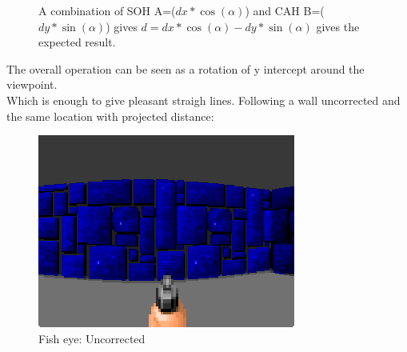 \begin{figure}[H]
\centering
 
 \caption{A combination of SOH A=($dx * \cos(\alpha)$) and CAH B=($ dy * \sin(\alpha) $) gives $d = dx * \cos(\alpha) - dy * \sin(\alpha) $ gives the expected result.}
\end{figure}

The overall operation can be seen as a rotation of y intercept around the viewpoint.\\
 Which is enough to give pleasant straigh lines. Following a wall uncorrected and the same location with projected distance:\\
 \begin{figure}[H]
\centering
 \includegraphics[width=\textwidth]{imgs/fish_eye/fish_eye.png}
  \caption{Fish eye: Uncorrected} 
 \end{figure}
 


